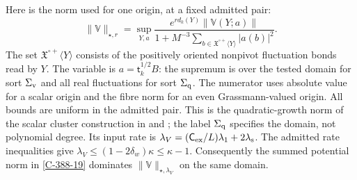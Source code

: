 \documentclass[11pt,letterpaper,reqno]{amsart}
\theoremstyle{definition}
\theoremstyle{remark}
\begin{document}
Here is the norm used for one origin, at a fixed admitted pair:
\begin{equation}\label{eq:qcd-origin-norm}
 \|\mathbb V\|_{\star,r}
 =\sup_{Y,a}
 \frac{e^{r d_k(Y)}\|\mathbb V(Y;a)\|}
 {1+M^{-3}\displaystyle\sum_{b\in\mathfrak X^{\circ+}\langle Y\rangle}|a(b)|^2}.
\end{equation}
The set $\mathfrak X^{\circ+}\langle Y\rangle$ consists of the
positively oriented nonpivot fluctuation bonds read by $Y$.
The variable is $a=\mathsf t_k^{1/2}B$: the supremum is over
the tested domain for sort $\Sigma_{\rm v}$ and all real
fluctuations for sort $\Sigma_{\rm q}$. The numerator uses
absolute value for a scalar origin and the fibre norm for an
even Grassmann-valued origin. All bounds are uniform in the
admitted pair. This is the quadratic-growth norm of the scalar
cluster construction in \cite[\S4.2]{YMM1} and \cite[eq.~4.lxxi]{YMM1}; the label
$\Sigma_{\rm q}$ specifies the domain, not polynomial degree.
Its input rate is
$\lambda_V=(\mathsf C_{\rm ex}/L)\lambda_1+2\lambda_{\rm s}$.
The admitted rate inequalities give
$\lambda_V\le(1-2\delta_w)\kappa\le\kappa-1$.
Consequently the summed potential norm in \cref{C-388-19}
dominates $\|\mathbb V\|_{\star,\lambda_V}$ on the same domain.
\end{document}
